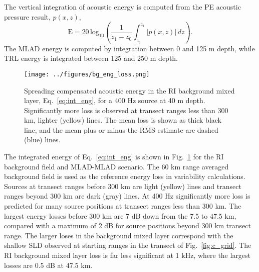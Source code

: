 \documentclass[preprint,NumberedRefs]{JASA}
\begin{document}
The vertical integration of acoustic energy is computed from the PE acoustic pressure result, $p(x, z)$,
\begin{equation}
        \textrm{E} = 20 \, \textrm{log}_{10} \left( \frac{1}{z_1 - z_0} \int^{z_1}_{z_0} \left| p(x, z) \right| \,  dz \right).
    \label{eq:int_eng}
\end{equation}
The MLAD energy is computed by integration between 0 and 125 m depth, while TRL energy is integrated between 125 and 250 m depth.

\begin{figure}
\texttt{[image: ../figures/bg\_eng\_loss.png]}
    \caption{Spreading compensated acoustic energy in the RI background mixed layer, Eq.~\eqref{eq:int_eng}, for a 400 Hz source at 40 m depth. Significantly more loss is observed at transect ranges less than 300 km, lighter (yellow) lines. The mean loss is shown as thick black line, and the mean plus or minus the RMS estimate are dashed (blue) lines.}
    \label{fig:bg_eng}
\end{figure}
The integrated energy of Eq.~\eqref{eq:int_eng} is shown in Fig.~\ref{fig:bg_eng} for the RI background field and MLAD-MLAD scenario. The 60 km range averaged background field is used as the reference energy loss in variability calculations. Sources at transect ranges before 300 km are light (yellow) lines and transect ranges beyond 300 km are dark (gray) lines. At 400 Hz significantly more loss is predicted for many source positions at transect ranges less than 300 km. The largest energy losses before 300 km are 7 dB down from the 7.5 to 47.5 km, compared with a maximum of 2 dB for source positions beyond 300 km transect range. The larger loses in the background mixed layer correspond with the shallow SLD observed at starting ranges in the transect of Fig.~\ref{fig:c_grid}. The RI background mixed layer loss is far less significant at 1 kHz, where the largest losses are 0.5 dB at 47.5 km.
\end{document}
